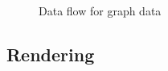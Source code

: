 \begin{figure}[thbp]
    \caption{\label{fig:maw_dataflow} Data flow for graph data}
\end{figure}

\subsection{Rendering}
\label{sect:smda_rendering}
